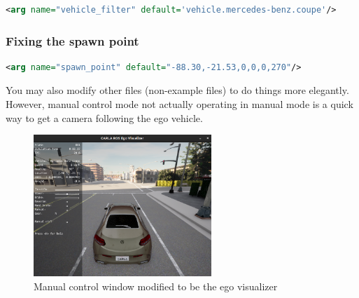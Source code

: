 \documentclass[a4paper,12pt]{report}
\begin{document}
\begin{lstlisting}[language=XML, caption=Argument that fixes Ego Vehicle type]
<arg name="vehicle_filter" default='vehicle.mercedes-benz.coupe'/>
\end{lstlisting}

\subsubsection{Fixing the spawn point}
\begin{lstlisting}[language=XML, caption=Argument that fixes Ego Vehicle type]
<arg name="spawn_point" default="-88.30,-21.53,0,0,0,270"/>
\end{lstlisting}

\noindent
You may also modify other files (non-example files) to do things more elegantly. However, manual control mode not actually operating in manual mode is a quick way to get a camera following the ego vehicle.

\begin{figure}[H]
	\centering
	\includegraphics[width=0.6\textwidth]{images/CARLA-2.png}
	\caption{Manual control window modified to be the ego visualizer}
\end{figure}
\end{document}
